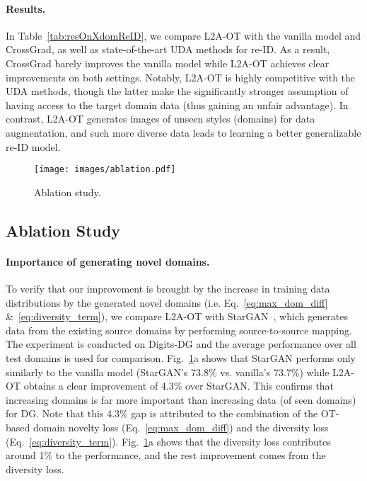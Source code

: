 \documentclass[runningheads]{llncs}
\begin{document}
\paragraph{Results.}
In Table~\ref{tab:resOnXdomReID}, we compare L2A-OT with the vanilla model and CrossGrad, as well as state-of-the-art UDA methods for re-ID. As a result, CrossGrad barely improves the vanilla model while L2A-OT achieves clear improvements on both settings. Notably, L2A-OT is highly competitive with the UDA methods, though the latter make the significantly stronger assumption of having access to the target domain data (thus gaining an unfair advantage). In contrast, L2A-OT generates images of unseen styles (domains) for data augmentation, and such more diverse data leads to learning a better generalizable re-ID model.

\begin{figure}[t]
    \centering
    \texttt{[image: images/ablation.pdf]}
    \caption{Ablation study.}
    \label{fig:ablation}
\end{figure}

\subsection{Ablation Study}

\paragraph{Importance of generating novel domains.}
To verify that our improvement is brought by the increase in training data distributions by the generated novel domains (i.e. Eq.~\eqref{eq:max_dom_diff} \&~\eqref{eq:diversity_term}), we compare L2A-OT with StarGAN~\cite{StarGAN}, which generates data from the existing source domains by performing source-to-source mapping. The experiment is conducted on Digits-DG and the average performance over all test domains is used for comparison. Fig.~\ref{fig:ablation}a shows that StarGAN performs only similarly to the vanilla model (StarGAN's 73.8\% vs. vanilla's 73.7\%) while L2A-OT obtains a clear improvement of 4.3\% over StarGAN. This confirms that increasing domains is far more important than increasing data (of seen domains) for DG. Note that this 4.3\% gap is attributed  to the combination of the OT-based domain novelty loss (Eq.~\eqref{eq:max_dom_diff}) and the diversity loss (Eq.~\eqref{eq:diversity_term}). 
Fig.~\ref{fig:ablation}a shows that the diversity loss  contributes around 1\% to the performance, and the rest improvement comes from the diversity loss.
\end{document}

